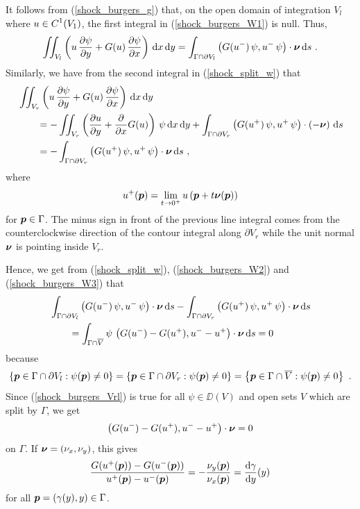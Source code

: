 It follows from (\ref{shock_burgers_g}) that, on the open
domain of integration $V_l$ where $\DS u \in C^1(V_1)$, the
first integral in (\ref{shock_burgers_W1}) is null.  Thus,
\begin{equation} \label{shock_burgers_W2}
\iint_{V_l}
\left(u\,\pdydx{\psi}{y} + G(u)\,\pdydx{\psi}{x} \right) \dx{x}\dx{y}
= \int_{\Gamma\cap\partial V_l} \left(G(u^-)\,\psi, u^-\,\psi \right)\cdot
\VEC{\nu} \dx{s} \ .
\end{equation}
Similarly, we have from the second integral in (\ref{shock_split_w}) that
\begin{align}
& \iint_{V_r}
\left(u\,\pdydx{\psi}{y} + G(u)\,\pdydx{\psi}{x} \right) \dx{x}\dx{y}
\nonumber \\
&\qquad = -\iint_{V_r}
\left( \pdydx{u}{y} + \pdfdx{G(u)}{x} \right)\,\psi  \dx{x}\dx{y}
+ \int_{\Gamma\cap\partial V_r}  \left(G(u^+)\,\psi, u^+\,\psi \right)\cdot
\left(-\VEC{\nu} \right) \dx{s} \nonumber \\
&\qquad = -\int_{\Gamma\cap\partial V_r}
\left(G(u^+)\,\psi, u^+\,\psi \right)\cdot \VEC{\nu} \dx{s} \ ,
\label{shock_burgers_W3}
\end{align}
where
\[
u^+(\VEC{p}) = \lim_{t\rightarrow 0^+}
u\left(\VEC{p}+t \VEC{\nu}(\VEC{p})\right)
\]
for $\VEC{p} \in \Gamma$.
The minus sign in front of the previous line integral comes from the
counterclockwise direction of the contour integral along $\partial V_r$
while the unit normal $\VEC{\nu}$ is pointing inside $V_r$.

Hence, we get from (\ref{shock_split_w}), (\ref{shock_burgers_W2}) and
(\ref{shock_burgers_W3}) that
\begin{align}
& \int_{\Gamma\cap \partial V_l} \left(G(u^-)\,\psi, u^-\,\psi \right)\cdot
\VEC{\nu} \dx{s}
- \int_{\Gamma\cap\partial V_r} \left(G(u^+)\,\psi, u^+\,\psi \right)\cdot
\VEC{\nu} \dx{s} \nonumber \\
&\qquad = \int_{\Gamma\cap \overline{V}} \psi\,
\left(G(u^-)-G(u^+), u^- - u^+\right)
\cdot \VEC{\nu} \dx{s} = 0 \label{shock_burgers_Vrl}
\end{align}
because
\[
\left\{ \VEC{p} \in \Gamma \cap \partial V_l : \psi(\VEC{p}) \neq 0 \right\}
=\left\{ \VEC{p} \in \Gamma \cap \partial V_r : \psi(\VEC{p}) \neq 0 \right\}
=\left\{ \VEC{p} \in \Gamma \cap \overline{V} : \psi(\VEC{p}) \neq 0 \right\}
\ .
\]
Since (\ref{shock_burgers_Vrl}) is true for all
$\psi \in \DD(V)$ and open sets $V$ which are split by $\Gamma$, we get
\[
\left(G(u^-)-G(u^+), u^- - u^+\right)\cdot \VEC{\nu} = 0
\]
on $\Gamma$.  If $\VEC{\nu} = (\nu_x, \nu_y)$, this gives
\begin{equation}\label{shock_rank_hug}
\frac{G(u^+(\VEC{p}))-G(u^-(\VEC{p}))}{u^+(\VEC{p}) - u^-(\VEC{p})}
= -\frac{\nu_y(\VEC{p})}{\nu_x(\VEC{p})} = \dydx{\gamma}{y}(y)
\end{equation}
for all $\VEC{p}=(\gamma(y),y) \in \Gamma$.

